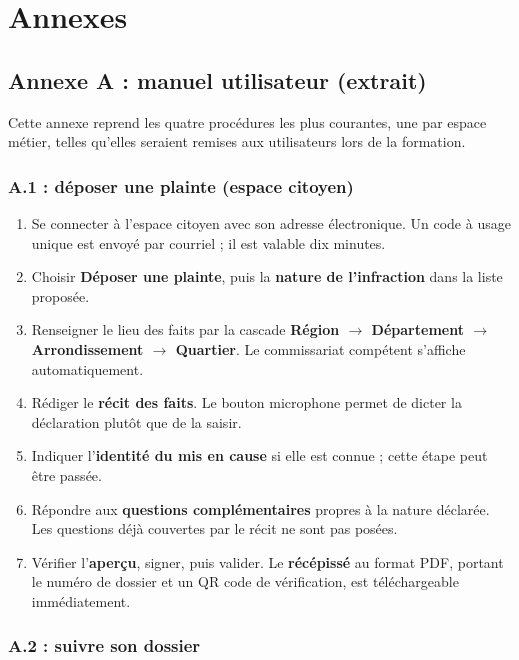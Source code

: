 
\chapter{Annexes}
\label{ch:annexes}

\section*{Annexe A : manuel utilisateur (extrait)}

Cette annexe reprend les quatre procédures les plus courantes, une par espace métier, telles qu'elles seraient remises aux utilisateurs lors de la formation.

\subsection*{A.1 : déposer une plainte (espace citoyen)}

\begin{enumerate}
    \item Se connecter à l'espace citoyen avec son adresse électronique. Un code à usage unique est envoyé par courriel ; il est valable dix minutes.
    \item Choisir \textbf{Déposer une plainte}, puis la \textbf{nature de l'infraction} dans la liste proposée.
    \item Renseigner le lieu des faits par la cascade \textbf{Région $\rightarrow$ Département $\rightarrow$ Arrondissement $\rightarrow$ Quartier}. Le commissariat compétent s'affiche automatiquement.
    \item Rédiger le \textbf{récit des faits}. Le bouton microphone permet de dicter la déclaration plutôt que de la saisir.
    \item Indiquer l'\textbf{identité du mis en cause} si elle est connue ; cette étape peut être passée.
    \item Répondre aux \textbf{questions complémentaires} propres à la nature déclarée. Les questions déjà couvertes par le récit ne sont pas posées.
    \item Vérifier l'\textbf{aperçu}, signer, puis valider. Le \textbf{récépissé} au format PDF, portant le numéro de dossier et un QR code de vérification, est téléchargeable immédiatement.
\end{enumerate}

\subsection*{A.2 : suivre son dossier}

